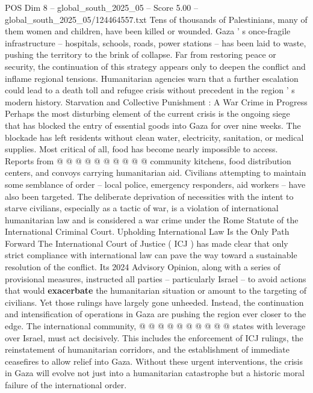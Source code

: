 \begin{textsample}{POS Dim 8 – global\_south\_2025\_05 – Score 5.00 – global\_south\_2025\_05/124464557.txt}
Tens of thousands of Palestinians, many of them women and children, have been killed or wounded.
Gaza ' s once-fragile infrastructure -- hospitals, schools, roads, power stations -- has been laid to waste, pushing the territory to the brink of collapse.
Far from restoring peace or security, the continuation of this strategy appears only to deepen the conflict and inflame regional tensions.
Humanitarian agencies warn that a further escalation could lead to a death toll and refugee crisis without precedent in the region ' s modern history.
Starvation and Collective Punishment : A War Crime in Progress Perhaps the most disturbing element of the current crisis is the ongoing siege that has blocked the entry of essential goods into Gaza for over nine weeks.
The blockade has left residents without clean water, electricity, sanitation, or medical supplies.
Most critical of all, food has become nearly impossible to access.
Reports from @ @ @ @ @ @ @ @ @ @ community kitchens, food distribution centers, and convoys carrying humanitarian aid.
Civilians attempting to maintain some semblance of order -- local police, emergency responders, aid workers -- have also been targeted.
The deliberate deprivation of necessities with the intent to starve civilians, especially as a tactic of war, is a violation of international humanitarian law and is considered a war crime under the Rome Statute of the International Criminal Court.
Upholding International Law Is the Only Path Forward The International Court of Justice ( ICJ ) has made clear that only strict compliance with international law can pave the way toward a sustainable resolution of the conflict.
Its 2024 Advisory Opinion, along with a series of provisional measures, instructed all parties -- particularly Israel -- to avoid actions that would \textbf{exacerbate} the humanitarian situation or amount to the targeting of civilians.
Yet those rulings have largely gone unheeded.
Instead, the continuation and intensification of operations in Gaza are pushing the region ever closer to the edge.
The international community, @ @ @ @ @ @ @ @ @ @ states with leverage over Israel, must act decisively.
This includes the enforcement of ICJ rulings, the reinstatement of humanitarian corridors, and the establishment of immediate ceasefires to allow relief into Gaza.
Without these urgent interventions, the crisis in Gaza will evolve not just into a humanitarian catastrophe but a historic moral failure of the international order.

\end{textsample}

